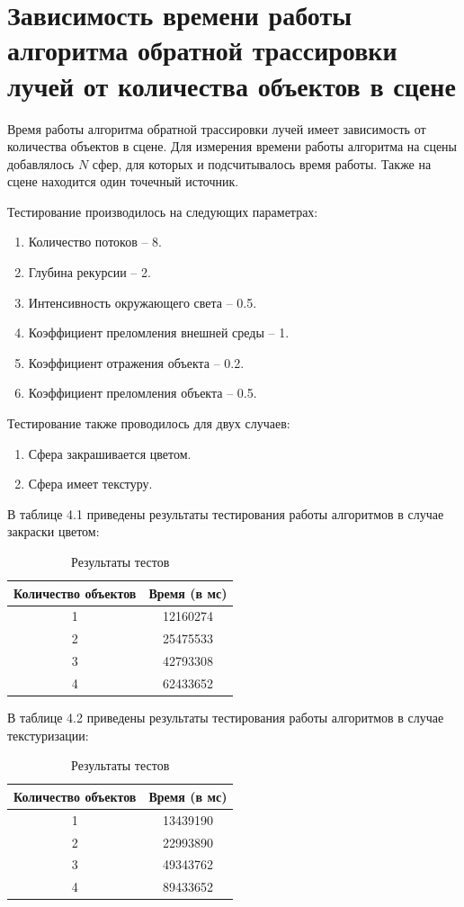 \section{Зависимость времени работы алгоритма обратной трассировки лучей от количества объектов в сцене}
Время работы алгоритма обратной трассировки лучей имеет зависимость от количества объектов в сцене.
Для измерения времени работы алгоритма на сцены добавлялось $ N $ сфер, для которых и подсчитывалось время работы.
Также на сцене находится один точечный источник. 

Тестирование производилось на следующих параметрах:
\begin{enumerate}
	\item Количество потоков -- 8.
	\item Глубина рекурсии -- 2.
	\item Интенсивность окружающего света -- 0.5.
	\item Коэффициент преломления внешней среды -- 1.
	\item Коэффициент отражения объекта -- 0.2.
	\item Коэффициент преломления объекта -- 0.5.
\end{enumerate}

Тестирование также проводилось для двух случаев:
\begin{enumerate}
	\item Сфера закрашивается цветом.
	\item Сфера имеет текстуру.
\end{enumerate}

В таблице 4.1 приведены результаты тестирования работы алгоритмов в случае закраски цветом:
\FloatBarrier
\begin{table}[h]
	\caption{Результаты тестов}
	\centering
	\begin{tabular}{ | c | c |}
		\hline
		Количество объектов & Время (в мс) \\ 
		\hline
		1 & 12160274 \\
		2 & 25475533 \\
		3 & 42793308 \\
		4 & 62433652 \\
		\hline
	\end{tabular}
\end{table}
\FloatBarrier

В таблице 4.2 приведены результаты тестирования работы алгоритмов в случае текстуризации:
\FloatBarrier
\begin{table}[h]
	\caption{Результаты тестов}
	\centering
	\begin{tabular}{ | c | c |}
		\hline
		Количество объектов & Время (в мс) \\ 
		\hline
		1 & 13439190 \\
		2 & 22993890 \\
		3 & 49343762 \\
		4 & 89433652 \\
		\hline
	\end{tabular}
\end{table}
\FloatBarrier

